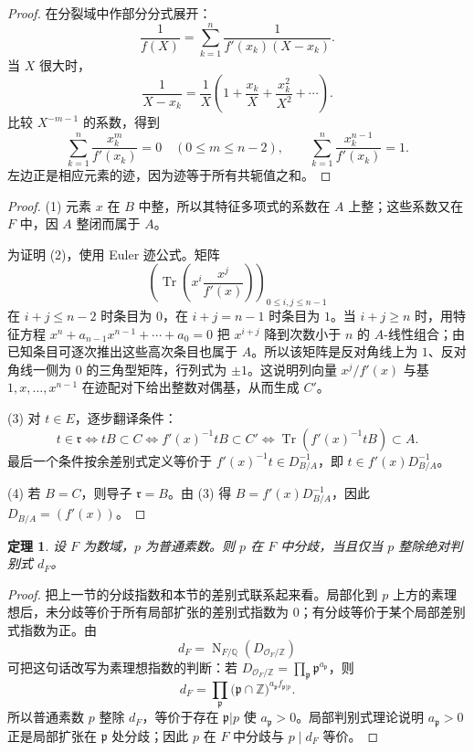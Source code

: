 \documentclass[11pt,a4paper,openany]{ctexbook}
\numberwithin{equation}{chapter}
\newcommand{\Q}{\mathbb{Q}}
\newcommand{\Z}{\mathbb{Z}}
\newcommand{\OF}{\mathcal{O}_F}
\newcommand{\Tr}{\operatorname{Tr}}
\newcommand{\Nm}{\operatorname{N}}
\theoremstyle{plain}
\newtheorem{theorem}{定理}[chapter]
\theoremstyle{definition}
\theoremstyle{remark}
\begin{document}
\begin{proof}
在分裂域中作部分分式展开：
\[
\frac1{f(X)}
=\sum_{k=1}^n\frac1{f'(x_k)(X-x_k)}.
\]
当 $X$ 很大时，
\[
\frac1{X-x_k}=\frac1X\left(1+\frac{x_k}{X}+\frac{x_k^2}{X^2}+\cdots\right).
\]
比较 $X^{-m-1}$ 的系数，得到
\[
\sum_{k=1}^n\frac{x_k^m}{f'(x_k)}=0\quad(0\le m\le n-2),
\qquad
\sum_{k=1}^n\frac{x_k^{n-1}}{f'(x_k)}=1.
\]
左边正是相应元素的迹，因为迹等于所有共轭值之和。
\end{proof}

\begin{proof}
(1) 元素 $x$ 在 $B$ 中整，所以其特征多项式的系数在 $A$ 上整；这些系数又在 $F$ 中，因 $A$ 整闭而属于 $A$。

为证明 (2)，使用 Euler 迹公式。矩阵
\[
\left(\Tr\left(x^i\frac{x^j}{f'(x)}\right)\right)_{0\le i,j\le n-1}
\]
在 $i+j\le n-2$ 时条目为 $0$，在 $i+j=n-1$ 时条目为 $1$。当
$i+j\ge n$ 时，用特征方程
$x^n+a_{n-1}x^{n-1}+\cdots+a_0=0$ 把 $x^{i+j}$ 降到次数小于 $n$ 的
$A$-线性组合；由已知条目可逐次推出这些高次条目也属于 $A$。所以该矩阵是反对角线上为
$1$、反对角线一侧为 $0$ 的三角型矩阵，行列式为 $\pm1$。这说明列向量
$x^j/f'(x)$ 与基 $1,x,\dots,x^{n-1}$ 在迹配对下给出整数对偶基，从而生成 $C'$。

(3) 对 $t\in E$，逐步翻译条件：
\[
t\in\mathfrak r
\Longleftrightarrow
tB\subset C
\Longleftrightarrow
f'(x)^{-1}tB\subset C'
\Longleftrightarrow
\Tr(f'(x)^{-1}tB)\subset A.
\]
最后一个条件按余差别式定义等价于 $f'(x)^{-1}t\in D_{B/A}^{-1}$，即
$t\in f'(x)D_{B/A}^{-1}$。

(4) 若 $B=C$，则导子 $\mathfrak r=B$。由 (3) 得 $B=f'(x)D_{B/A}^{-1}$，因此 $D_{B/A}=(f'(x))$。
\end{proof}

\begin{theorem}
设 $F$ 为数域，$p$ 为普通素数。则 $p$ 在 $F$ 中分歧，当且仅当 $p$ 整除绝对判别式 $d_F$。
\end{theorem}

\begin{proof}
把上一节的分歧指数和本节的差别式联系起来看。局部化到 $p$ 上方的素理想后，未分歧等价于所有局部扩张的差别式指数为 $0$；有分歧等价于某个局部差别式指数为正。由
\[
d_F=\Nm_{F/\Q}(D_{\OF/\Z})
\]
可把这句话改写为素理想指数的判断：若
$D_{\OF/\Z}=\prod_{\mathfrak p}\mathfrak p^{a_{\mathfrak p}}$，则
\[
d_F=\prod_{\mathfrak p}\bigl(\mathfrak p\cap\Z\bigr)^{a_{\mathfrak p}f_{\mathfrak p|p}}.
\]
所以普通素数 $p$ 整除 $d_F$，等价于存在 $\mathfrak p|p$ 使
$a_{\mathfrak p}>0$。局部判别式理论说明 $a_{\mathfrak p}>0$ 正是局部扩张在
$\mathfrak p$ 处分歧；因此 $p$ 在 $F$ 中分歧与 $p\mid d_F$ 等价。
\end{proof}
\end{document}
